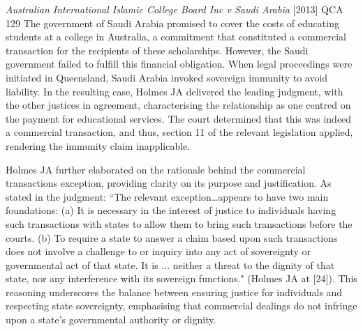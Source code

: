 \begin{casedetails}{\textit{Australian International Islamic College Board Inc v Saudi Arabia} [2013] QCA 129}
    \flushleft
    The government of Saudi Arabia promised to cover the costs of educating students at a college in Australia, a commitment that constituted a commercial transaction for the recipients of these scholarships. However, the Saudi government failed to fulfill this financial obligation. When legal proceedings were initiated in Queensland, Saudi Arabia invoked sovereign immunity to avoid liability. In the resulting case, Holmes JA delivered the leading judgment, with the other justices in agreement, characterising the relationship as one centred on the payment for educational services. The court determined that this was indeed a commercial transaction, and thus, section 11 of the relevant legislation applied, rendering the immunity claim inapplicable.

    \vspace{\baselineskip}

    Holmes JA further elaborated on the rationale behind the commercial transactions exception, providing clarity on its purpose and justification. As stated in the judgment: ``The relevant exception…appears to have two main foundations: (a) It is necessary in the interest of justice to individuals having such transactions with states to allow them to bring such transactions before the courts. (b) To require a state to answer a claim based upon such transactions does not involve a challenge to or inquiry into any act of sovereignty or governmental act of that state. It is ... neither a threat to the dignity of that state, nor any interference with its sovereign functions." (Holmes JA at [24]). This reasoning underscores the balance between ensuring justice for individuals and respecting state sovereignty, emphasising that commercial dealings do not infringe upon a state's governmental authority or dignity.
\end{casedetails}

